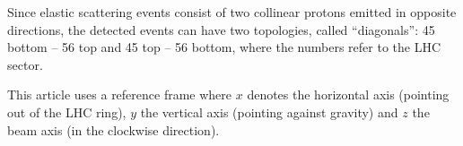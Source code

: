 Since elastic scattering events consist of two collinear protons emitted in opposite directions, the detected events can have two topologies, called ``diagonals'': 45 bottom -- 56 top and 45 top -- 56 bottom, where the numbers refer to the LHC sector.

This article uses a reference frame where $x$ denotes the horizontal axis (pointing out of the LHC ring), $y$ the vertical axis (pointing against gravity) and $z$ the beam axis (in the clockwise direction).

